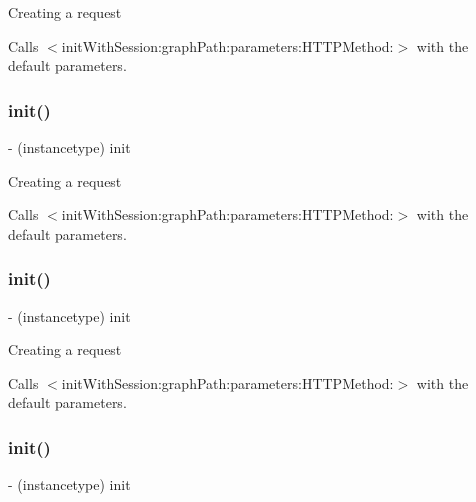 Creating a request

Calls $<$init\+With\+Session\+:graph\+Path\+:parameters\+:\+H\+T\+T\+P\+Method\+:$>$ with the default parameters. \mbox{\label{interfaceFBRequest_a9e753030844abe92959a169b508f0a2b}} 
\subsubsection{\texorpdfstring{init()}{init()}\hspace{0.1cm}{\footnotesize\ttfamily [2/5]}}
{\footnotesize\ttfamily -\/ (instancetype) init \begin{DoxyParamCaption}{ }\end{DoxyParamCaption}}

Creating a request

Calls $<$init\+With\+Session\+:graph\+Path\+:parameters\+:\+H\+T\+T\+P\+Method\+:$>$ with the default parameters. \mbox{\label{interfaceFBRequest_a9e753030844abe92959a169b508f0a2b}} 
\subsubsection{\texorpdfstring{init()}{init()}\hspace{0.1cm}{\footnotesize\ttfamily [3/5]}}
{\footnotesize\ttfamily -\/ (instancetype) init \begin{DoxyParamCaption}{ }\end{DoxyParamCaption}}

Creating a request

Calls $<$init\+With\+Session\+:graph\+Path\+:parameters\+:\+H\+T\+T\+P\+Method\+:$>$ with the default parameters. \mbox{\label{interfaceFBRequest_a9e753030844abe92959a169b508f0a2b}} 
\subsubsection{\texorpdfstring{init()}{init()}\hspace{0.1cm}{\footnotesize\ttfamily [4/5]}}
{\footnotesize\ttfamily -\/ (instancetype) init \begin{DoxyParamCaption}{ }\end{DoxyParamCaption}}

